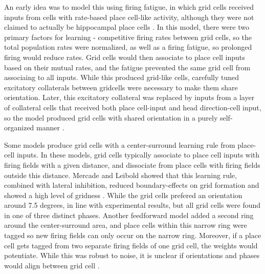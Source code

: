 \documentclass{article}
\begin{document}
    An early idea was to model this using firing fatigue, in which grid cells received inputs from cells with rate-based place cell-like activity, although they were not claimed to actually be hippocampal place cells \parencite{Kropff2008}. In this model, there were two primary factors for learning - competitive firing rates between grid cells, so the total population rates were normalized, as well as a firing fatigue, so prolonged firing would reduce rates. Grid cells would then associate to place cell inputs based on their mutual rates, and the fatigue prevented the same grid cell from associaing to all inputs. While this produced grid-like cells, carefully tuned excitatory collaterals between gridcells were necessary to make them share orientation.
    Later, this excitatory collateral was replaced by inputs from a layer of collateral cells that received both place cell-input and head direction-cell input, so the model produced grid cells with shared orientation in a purely self-organized manner \parencite{Si2013}.

    Some models produce grid cells with a center-surround learning rule from place-cell inputs. In these models, grid cells typically associate to place cell inputs with firing fields with a given distance, and dissociate from place cells with firing fields outside this distance. Mercade and Leibold showed that this learning rule, combined with lateral inhibition, reduced boundary-effects on grid formation and showed a high level of gridness \parencite{Mercado2020}. While the grid cells prefered an orientation around 7.5 degrees, in line with experimental results, but all grid cells were found in one of three distinct phases. Another feedforward model added a second ring around the center-surround area, and place cells within this narrow ring were tagged so new firing fields can only occur on the narrow ring. Moreover, if a place cell gets tagged from two separate firing fields of one grid cell, the weights would potentiate. While this was robust to noise, it is unclear if orientations and phases would align between grid cell \parencite{Castro2014}.
\end{document}
